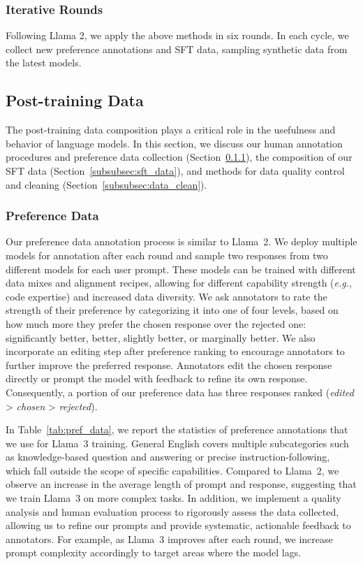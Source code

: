 \subsubsection{Iterative Rounds}

Following Llama 2, we apply the above methods in six rounds. In each cycle, we collect new preference annotations and SFT data, sampling synthetic data from the latest models. 

\subsection{Post-training Data}
\label{sec:finetuning_data}

The post-training data composition plays a critical role in the usefulness and behavior of language models. In this section, we discuss our human annotation procedures and preference data collection (Section~\ref{sec:rlhf_annotation_data}), the composition of our SFT data (Section~\ref{subsubsec:sft_data}), and methods for data quality control and cleaning (Section~\ref{subsubsec:data_clean}).

\subsubsection{Preference Data} 
\label{sec:rlhf_annotation_data}

Our preference data annotation process is similar to Llama~2. We deploy multiple models for annotation after each round and sample two responses from two different models for each user prompt. These models can be trained with different data mixes and alignment recipes, allowing for different capability strength (\emph{e.g.}, code expertise) and increased data diversity. We ask annotators to rate the strength of their preference by categorizing it into one of four levels, based on how much more they prefer the chosen response over the rejected one: significantly better, better, slightly better, or marginally better. We also incorporate an editing step after preference ranking to encourage annotators to further improve the preferred response. Annotators edit the chosen response directly or prompt the model with feedback to refine its own response. Consequently, a portion of our preference data has three responses ranked (\emph{edited} > \emph{chosen} > \emph{rejected}).

In Table~\ref{tab:pref_data}, we report the statistics of preference annotations that we use for Llama~3 training. General English covers multiple subcategories such as knowledge-based question and answering or precise instruction-following, which fall outside the scope of specific capabilities. Compared to Llama~2, we observe an increase in the average length of prompt and response, suggesting that we train Llama~3 on more complex tasks. In addition, we implement a quality analysis and human evaluation process to rigorously assess the data collected, allowing us to refine our prompts and provide systematic, actionable feedback to annotators. For example, as Llama~3 improves after each round, we increase prompt complexity accordingly to target areas where the model lags.


